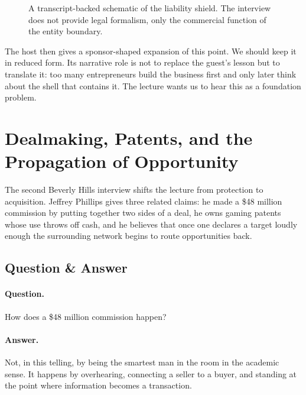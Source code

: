 \begin{figure}[h]
\centering
{}
\caption{A transcript-backed schematic of the liability shield. The interview does not provide legal formalism, only the commercial function of the entity boundary.}
\end{figure}

The host then gives a sponsor-shaped expansion of this point. We should keep it in reduced form. Its narrative role is not to replace the guest's lesson but to translate it: too many entrepreneurs build the business first and only later think about the shell that contains it. The lecture wants us to hear this as a foundation problem.

\section{Dealmaking, Patents, and the Propagation of Opportunity}

The second Beverly Hills interview shifts the lecture from protection to acquisition. Jeffrey Phillips gives three related claims: he made a \$48 million commission by putting together two sides of a deal, he owns gaming patents whose use throws off cash, and he believes that once one declares a target loudly enough the surrounding network begins to route opportunities back.

\subsection{Question \& Answer}

\paragraph{Question.}
How does a \$48 million commission happen?

\paragraph{Answer.}
Not, in this telling, by being the smartest man in the room in the academic sense. It happens by overhearing, connecting a seller to a buyer, and standing at the point where information becomes a transaction.

